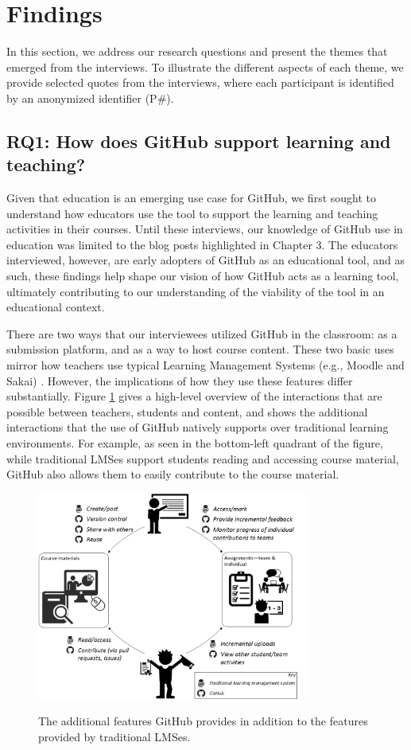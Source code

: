 \section{Findings}
\label{sec:results}
In this section, we address our research questions and present the themes that emerged from the interviews. To illustrate the different aspects of each theme, we provide selected quotes from the interviews, where each participant is identified by an anonymized identifier (P\#).

\subsection{RQ1: How does GitHub support learning and teaching?}
Given that education is an emerging use case for GitHub, we first sought to understand how educators use the tool to support the learning and teaching activities in their courses. Until these interviews, our knowledge of GitHub use in education was limited to the blog posts highlighted in Chapter 3. The educators interviewed, however, are early adopters of GitHub as an educational tool, and as such, these findings help shape our vision of how GitHub acts as a learning tool, ultimately contributing to our understanding of the viability of the tool in an educational context.

There are two ways that our interviewees utilized GitHub in the classroom: as a submission platform, and as a way to host course content. These two basic uses mirror how teachers use typical Learning Management Systems (e.g., Moodle and Sakai) \cite{malikowski2007model}. However, the implications of how they use these features differ substantially. Figure \ref{fig:edu_workflow} gives a high-level overview of the interactions that are possible between teachers, students and content, and shows the additional interactions that the use of GitHub natively supports over traditional learning environments. For example, as seen in the bottom-left quadrant of the figure, while traditional LMSes support students reading and accessing course material, GitHub also allows them to easily contribute to the course material.

\begin{figure}[h!]
 \caption{The additional features GitHub provides in addition to the features provided by traditional LMSes.}
 \centering
   \includegraphics[width=0.8\textwidth]{EduWorkflowLargeType}
 \label{fig:edu_workflow}
\end{figure}

